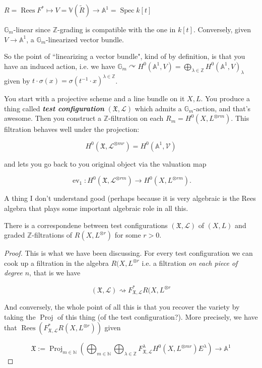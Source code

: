 $R=\operatorname{Rees}F^* \mapsto  V=
\mathbb{V}(\tilde{R}) \to
\mathbb{A}^1=\operatorname{Spec}k[t]$

$\mathbb{G}_m$-linear since
$\mathbb{Z}$-grading is compatible with the
one in $k[t]$. Conversely, given  $V \to
\mathbb{A}^1$, a $\mathbb{G}_m$-linearized
vector bundle.

So the point of ``linearizing a vector
bundle", kind of by definition, is that you
have an induced action, i.e. we have
$\mathbb{G}_m \curvearrowright
H^{0}(\mathbb{A}^1,V)=\bigoplus_{\lambda \in
\mathbb{Z}}H^{0}(\mathbb{A}^1,V)_\lambda$
given by $t \cdot
\sigma(x)=\sigma(t^{-1}\cdot x)^{\lambda \in
\mathbb{Z}}$.

\medskip{}
You start with a projective scheme and a line
bundle on it $X,L$. You produce a thing
called \textit{\textbf{test configuration}}
$(\mathfrak{X},\mathcal{L})$ which admits a
$\mathbb{G}_m$-action, and that's awesome.
Then you construct a  $\mathbb{Z}$-filtration
on each $R_m=H^{0}(X,L^{\otimes rm})$. This
filtration behaves well under the projection:

$$
H^{0}(\mathfrak{X},\mathcal{L}^{\otimes
mr})=H^{0}(\mathbb{A}^1, \mathcal{V})
$$

and lets you go back to you original object
via the valuation map

$$
\operatorname{ev}_1:H^{0}(\mathfrak{X},
\mathcal{
L}^{\otimes rm}) \to H^{0}(X, L^{ \otimes r m
}).
$$

A thing I don't understand good (perhaps
because it is very algebraic is the Rees
algebra that plays some important algebraic
role in all this.

\begin{theorem}
\label{theorem-montero-1}
There is a correspondene between test
configurations $(\mathfrak{X},\mathcal{ L})$
of $(X,L)$ and graded
$\mathbb{Z}$-filtrations of $R(X,L^{\otimes
r})$ for some $r>0$.
\end{theorem}

\begin{proof}
This is what we have been discussing. For
every test configuration we can cook up a
filtration in the algebra $R(X,L^{ \otimes
r}$ i.e. a filtration \textit{on each piece
of degree $n$}, that is we have

$$
(\mathfrak{X},\mathcal{L}) \rightsquigarrow
F^*_{\mathfrak{X},\mathcal{L}}R(X,L^{\otimes
r }
$$

And conversely, the whole point of all this
is that you recover the variety by taking the
$\operatorname{Proj}$ of this thing (of the
test configuration?). More precisely, we have
that
$\operatorname{Rees}(F^*_{\mathfrak{X},
\mathcal{L}}R(X,L^{\otimes
r }))$ given

$$
\mathfrak{X}:=\operatorname{Proj}_{m \in
\mathbb{N}}\left(\bigoplus_{m \in \mathbb{N}}
\bigoplus_{\lambda \in
\mathbb{Z}}F^\lambda_{\mathfrak{X},
\mathcal{L}}H^{0}(X,L^{\otimes
m r })E^\lambda\right) \to \mathbb{A}^1
$$

\end{proof}

